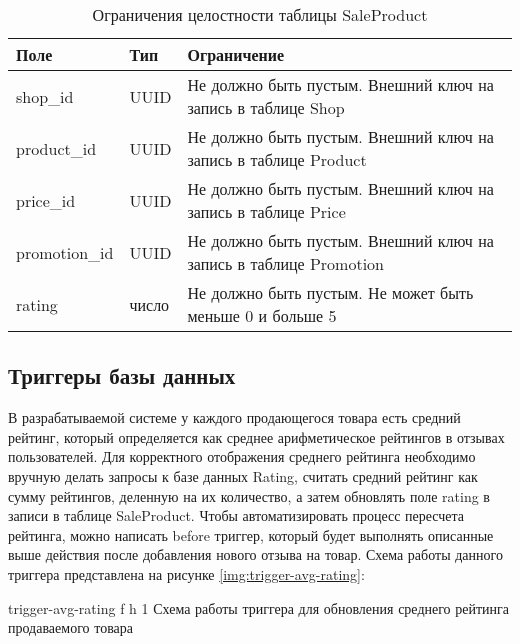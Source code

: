 \clearpage
\begin{table}[!h]
	\begin{center}
		\begin{threeparttable}
			\caption{Ограничения целостности таблицы SaleProduct}
			\label{tbl:entity_sale_product}
			\begin{tabular}{|p{4.5cm}|p{2.5cm}|p{8.5cm}|}
				\hline 
				\textbf{Поле} & \textbf{Тип} & \textbf{Ограничение}  \\
				\hline
				shop\_id & UUID & Не должно быть пустым. Внешний ключ на запись в таблице Shop  \\
				\hline
				product\_id & UUID & Не должно быть пустым. Внешний ключ на запись в таблице Product \\
				\hline
				price\_id & UUID & Не должно быть пустым. Внешний ключ на запись в таблице Price  \\
				\hline
				promotion\_id & UUID & Не должно быть пустым. Внешний ключ на запись в таблице Promotion \\
				\hline
				rating & число & Не должно быть пустым. Не может быть меньше 0 и больше 5 \\
				\hline
			\end{tabular}
		\end{threeparttable}			
	\end{center}
\end{table}

\subsection{Триггеры базы данных}

В разрабатываемой системе у каждого продающегося товара есть средний рейтинг, который определяется как среднее арифметическое рейтингов в отзывах пользователей. Для корректного отображения среднего рейтинга необходимо вручную делать запросы к базе данных Rating, считать средний рейтинг как сумму рейтингов, деленную на их количество, а затем обновлять поле rating в записи в таблице SaleProduct. Чтобы автоматизировать процесс пересчета рейтинга, можно написать before триггер, который будет выполнять описанные выше действия после добавления нового отзыва на товар. Схема работы данного триггера представлена на рисунке \ref{img:trigger-avg-rating}: 

{trigger-avg-rating} %
{f} %
{h} %
{1\textwidth} %
{Схема работы триггера для обновления среднего рейтинга продаваемого товара} %



